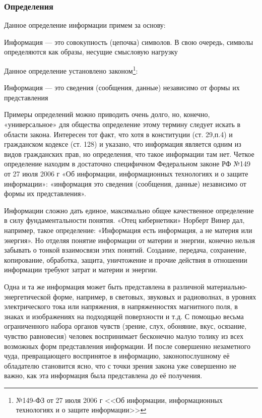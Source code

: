 \begin{frame}
    \frametitle{Определения}
    
    Данное определение информации примем за основу:
    \begin{definition}
        \alert{Информация} --- это совокупность (цепочка) \alert{символов}. В свою очередь, \alert{символы} определяются как образы, несущие смысловую нагрузку
    \end{definition}

    Данное определение установлено законом\footnote{№149-ФЗ от 27 июля 2006 г <<Об информации, информационных технологиях и о защите информации>>}:
    \begin{definition}
        \alert{Информация} --- это сведения (сообщения, данные) независимо от формы их представления
    \end{definition}
\end{frame}

Примеры определений можно приводить очень долго, но, конечно, «универсальное» для общества определение этому термину следует искать в области закона. Интересен тот факт, что хотя в конституции (ст. 29,п.4) и гражданском кодексе (ст. 128) и указано, что информация является одним из видов гражданских прав, но определения, что такое информации там нет. Четкое определение находим в достаточно специфичном Федеральном законе РФ №149 от 27 июля 2006 г «Об информации, информационных технологиях и о защите информации»: «информация это сведения (сообщения, данные) независимо от формы их представления». 

Информации сложно дать единое, максимально общее качественное определение в силу фундаментальности понятия. «Отец кибернетики» Норберт Винер дал, например, такое определение: «Информация есть информация, а не материя или энергия». Но отделяя понятие информации от материи и энергии, конечно нельзя забывать о тонкой взаимосвязи этих понятий. Создание, передача, сохранение, копирование, обработка, защита, уничтожение и прочие действия в отношении информации требуют затрат и материи и энергии. 

Одна и та же информация может быть представлена в различной материально-энергетической форме, например, в световых, звуковых и радиоволнах, в уровнях электрического тока или напряжения, в напряженностях магнитного поля, в знаках и изображениях на подходящей поверхности и т.д. С помощью весьма ограниченного набора органов чувств (зрение, слух, обоняние, вкус, осязание, чувство равновесия) человек воспринимает бесконечно малую толику из всех возможных форм представления информации. И после совершенно незаметного чуда, превращающего воспринятое в информацию, законопослушному её обладателю становится ясно, что с точки зрения закона уже совершенно не важно, как эта информация была представлена до её получения.


